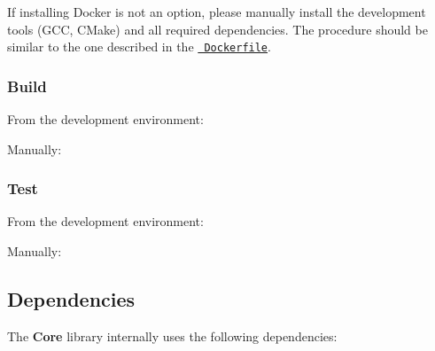 If installing Docker is not an option, please manually install the development tools (G\+CC, C\+Make) and all required dependencies. The procedure should be similar to the one described in the \href{./tools/development/docker/Dockerfile}{\texttt{ Dockerfile}}.

\subsubsection*{Build}

From the development environment\+:


\begin{DoxyCode}{0}
\end{DoxyCode}


Manually\+:


\begin{DoxyCode}{0}
\end{DoxyCode}


\subsubsection*{Test}

From the development environment\+:


\begin{DoxyCode}{0}
\end{DoxyCode}


Manually\+:


\begin{DoxyCode}{0}
\end{DoxyCode}


\subsection*{Dependencies}

The {\bfseries{Core}} library internally uses the following dependencies\+:

